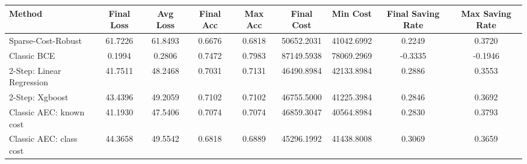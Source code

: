 \begin{tabular}{lcccccccc}
\toprule
Method & Final Loss & Avg Loss & Final Acc & Max Acc & Final Cost & Min Cost & Final Saving Rate & Max Saving Rate \\
\midrule
Sparse-Cost-Robust & 61.7226 & 61.8493 & 0.6676 & 0.6818 & 50652.2031 & 41042.6992 & 0.2249 & 0.3720 \\
Classic BCE & 0.1994 & 0.2806 & 0.7472 & 0.7983 & 87149.5938 & 78069.2969 & -0.3335 & -0.1946 \\
2-Step: Linear Regression & 41.7511 & 48.2468 & 0.7031 & 0.7131 & 46490.8984 & 42133.8984 & 0.2886 & 0.3553 \\
2-Step: Xgboost & 43.4396 & 49.2059 & 0.7102 & 0.7102 & 46755.5000 & 41225.3984 & 0.2846 & 0.3692 \\
Classic AEC: known cost & 41.1930 & 47.5406 & 0.7074 & 0.7074 & 46859.3047 & 40564.8984 & 0.2830 & 0.3793 \\
Classic AEC: class cost & 44.3658 & 49.5542 & 0.6818 & 0.6889 & 45296.1992 & 41438.8008 & 0.3069 & 0.3659 \\
\bottomrule
\end{tabular}
